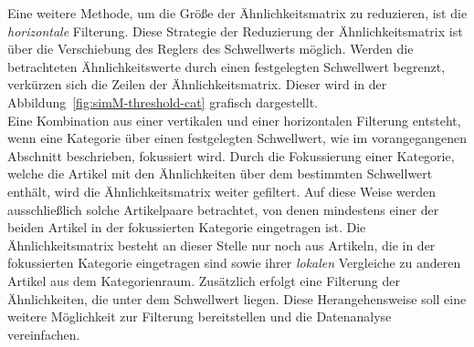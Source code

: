 Eine weitere Methode, um die Größe der Ähnlichkeitsmatrix zu reduzieren, ist die \emph{horizontale} Filterung.
Diese Strategie der Reduzierung der Ähnlichkeitsmatrix ist über die Verschiebung des Reglers des Schwellwerts möglich.
Werden die betrachteten Ähnlichkeitswerte durch einen festgelegten Schwellwert begrenzt, verkürzen sich die Zeilen der Ähnlichkeitsmatrix.
Dieser wird in der Abbildung~\ref{fig:simM-threshold-cat} grafisch dargestellt.\\
Eine Kombination aus einer vertikalen und einer horizontalen Filterung entsteht, wenn eine Kategorie über einen festgelegten Schwellwert, wie im vorangegangenen Abschnitt beschrieben, fokussiert wird.
Durch die Fokussierung einer Kategorie, welche die Artikel mit den Ähnlichkeiten über dem bestimmten Schwellwert enthält, wird die Ähnlichkeitsmatrix weiter gefiltert.
Auf diese Weise werden ausschließlich solche Artikelpaare betrachtet, von denen mindestens einer der beiden Artikel in der fokussierten Kategorie eingetragen ist.
Die Ähnlichkeitsmatrix besteht an dieser Stelle nur noch aus Artikeln, die in der fokussierten Kategorie eingetragen sind sowie ihrer \emph{lokalen} Vergleiche zu anderen Artikel aus dem Kategorienraum.
Zusätzlich erfolgt eine Filterung der Ähnlichkeiten, die unter dem Schwellwert liegen.
Diese Herangehensweise soll eine weitere Möglichkeit zur Filterung bereitstellen und die Datenanalyse vereinfachen.

